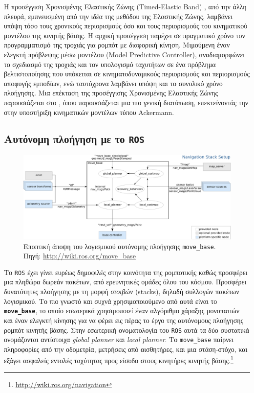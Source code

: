 Η προσέγγιση Χρονισμένης Ελαστικής Ζώνης (Timed-Elastic Band)
\cite{ChristophRoesmann}, από την άλλη πλευρά, εμπνευσμένη από την ιδέα της
μεθόδου της Ελαστικής Ζώνης, λαμβάνει υπόψη τόσο τους χρονικούς περιορισμούς
όσο και τους περιορισμούς του κινηματικού μοντέλου της κινητής βάσης. Η αρχική
προσέγγιση παρέχει σε πραγματικό χρόνο τον προγραμματισμό της τροχιάς για
ρομπότ με διαφορική κίνηση. Μιμούμενη έναν ελεγκτή πρόβλεψης μέσω μοντέλου
(Model Predictive Controller), αναδιαμορφώνει το σχεδιασμό της τροχιάς και τον
υπολογισμό ταχυτήτων σε ένα πρόβλημα βελτιστοποίησης που υπόκειται σε
κινηματοδυναμικούς περιορισμούς και περιορισμούς αποφυγής εμποδίων, ενώ
ταυτόχρονα λαμβάνει υπόψη και το συνολικό χρόνο πλοήγησης. Μια επέκταση της
προσέγγισης Χρονισμένης Ελαστικής Ζώνης παρουσιάζεται στο \cite{Rosmann2017},
όπου παρουσιάζεται μια πιο γενική διατύπωση, επεκτείνοντάς την στην υποστήριξη
κινηματικών μοντέλων τύπου Ackermann.


\subsection{Αυτόνομη πλοήγηση με το \texttt{ROS}}
\label{subsection:02_01_02:03}

\begin{figure}\centering
  \includegraphics[width=\textwidth]{./figures/parts/01/chapters/03/sections/01/move_base.png}
  \caption{\small Εποπτική άποψη του λογισμικού αυτόνομης πλοήγησης
           \texttt{move\_base}. Πηγή: \url{http://wiki.ros.org/move\_base}}
  \label{fig:movebase}
\end{figure}

Το \texttt{ROS} έχει γίνει ευρέως δημοφιλές στην κοινότητα της ρομποτικής καθώς
προσφέρει μια πληθώρα δωρεάν πακέτων, από ερευνητικές ομάδες όλου του κόσμου.
Προσφέρει δυνατότητες πλοήγησης με τη μορφή \textit{στοιβών} (stacks), δηλαδή
συλλογών πακέτων λογισμικού. Το πιο γνωστό και συχνά χρησιμοποιούμενο από αυτά
είναι το \texttt{\textbf{move\_base}}, το οποίο εσωτερικά χρησιμοποιεί έναν
αλγόριθμο χάραξης μονοπατιών και έναν ελεγκτή κίνησης για να φέρει εις πέρας
το έργο της αυτόνομους πλοήγησης ρομπότ κινητής βάσης. Στην εσωτερική
ονοματολογία του \texttt{ROS} αυτά τα δύο συστατικά ονομάζονται αντίστοιχα
\textit{global planner} και \textit{local planner}. Το \texttt{move\_base}
παίρνει πληροφορίες από την οδομετρία, μετρήσεις από αισθητήρες, και μια
στάση-στόχο, και εξάγει ασφαλείς εντολές ταχύτητας προς είσοδο στους κινητήρες
κινητής βάσης.\footnote{\url{http://wiki.ros.org/navigation}}

